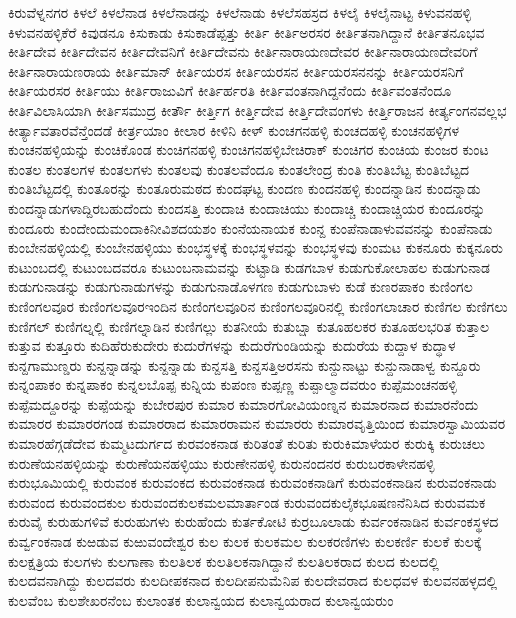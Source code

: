 {ಕಿರುವೆಳ್ನನಗರ
ಕಿಳಲೆ
ಕಿಳಲೆನಾಡ
ಕಿಳಲೆನಾಡನ್ನು
ಕಿಳಲೆನಾಡು
ಕಿಳಲೆಸಹಸ್ರದ
ಕಿಳಲೈ
ಕಿಳಲೈನಾಟ್ಟ
ಕಿಳುವನಹಳ್ಳಿ
ಕಿಳುವನಹಳ್ಳಿಕೆರೆ
ಕಿವುಡನೂ
ಕಿಸುಕಾಡು
ಕಿಸುಕಾಡೆಪ್ಪತ್ತು
ಕೀರ್ತಿ
ಕೀರ್ತಿಅರಸರ
ಕೀರ್ತಿತನಾಗಿದ್ದಾನೆ
ಕೀರ್ತಿತನೂಭವ
ಕೀರ್ತಿದೇವ
ಕೀರ್ತಿದೇವನ
ಕೀರ್ತಿದೇವನಿಗೆ
ಕೀರ್ತಿದೇವನು
ಕೀರ್ತಿನಾರಾಯಣದೇವರ
ಕೀರ್ತಿನಾರಾಯಣದೇವರಿಗೆ
ಕೀರ್ತಿನಾರಾಯಣರಾಯ
ಕೀರ್ತಿಮಾನ್
ಕೀರ್ತಿಯರಸ
ಕೀರ್ತಿಯರಸನ
ಕೀರ್ತಿಯರಸನನನ್ನು
ಕೀರ್ತಿಯರಸನಿಗೆ
ಕೀರ್ತಿಯರಸರ
ಕೀರ್ತಿಯು
ಕೀರ್ತಿರಾಜುವಿಗೆ
ಕೀರ್ತಿರ್ಹರತಿ
ಕೀರ್ತಿವಂತನಾಗಿದ್ದನೆಂದು
ಕೀರ್ತಿವಂತನೆಂದೂ
ಕೀರ್ತಿವಿಲಾಸಿಯಾಗಿ
ಕೀರ್ತಿಸಮುದ್ರ
ಕೀರ್ತೌ
ಕೀರ್ತ್ತಿಗ
ಕೀರ್ತ್ತಿದೇವ
ಕೀರ್ತ್ತಿದೇವಂಗಳು
ಕೀರ್ತ್ತಿರಾಜನ
ಕೀರ್ತ್ಯಂಗನವಲ್ಲಭ
ಕೀರ್ತ್ಯಾವತಾರವೆನ್ತೆಂದಡೆ
ಕೀರ್ತ್ರಯಾಂ
ಕೀಲಾರ
ಕೀಳಿನಿ
ಕೀಳ್
ಕುಂಚಗನಹಳ್ಳಿ
ಕುಂಚದಹಳ್ಳಿ
ಕುಂಚನಹಳ್ಳಿಗಳ
ಕುಂಚನಹಳ್ಳಿಯನ್ನು
ಕುಂಚಿಕೊಂಡ
ಕುಂಚಿಗನಹಳ್ಳಿ
ಕುಂಚಿಗನಹಳ್ಳಿಬೇಚಿರಾಕ್
ಕುಂಚಿಗರ
ಕುಂಚಿಯ
ಕುಂಜರ
ಕುಂಟ
ಕುಂತಲ
ಕುಂತಲಗಳ
ಕುಂತಲಗಳು
ಕುಂತಲವು
ಕುಂತಲವೆಂದೂ
ಕುಂತಲೇಂದ್ರ
ಕುಂತಿ
ಕುಂತಿಬೆಟ್ಟ
ಕುಂತಿಬೆಟ್ಟದ
ಕುಂತಿಬೆಟ್ಟದಲ್ಲಿ
ಕುಂತೂರನ್ನು
ಕುಂತೂರುಮಠದ
ಕುಂದಘಟ್ಟ
ಕುಂದಣ
ಕುಂದನಹಳ್ಳಿ
ಕುಂದನ್ನಾಡಿನ
ಕುಂದನ್ನಾಡು
ಕುಂದನ್ನಾಡುಗಳಾದ್ದಿರಬಹುದೆಂದು
ಕುಂದಸತ್ತಿ
ಕುಂದಾಚಿ
ಕುಂದಾಚಿಯು
ಕುಂದಾಚ್ಚಿ
ಕುಂದಾಚ್ಚಿಯರ
ಕುಂದೂರನ್ನು
ಕುಂದೂರು
ಕುಂದೇಂದುಮಂದಾಕಿನೀವಿಶದಯಶಂ
ಕುಂನೆಯನಾಯಕ
ಕುಂನ್ದ
ಕುಂಪೆನಾಡಾಳುವವನನ್ನು
ಕುಂಪೆನಾಡು
ಕುಂಬೇನಹಳ್ಳಿಯಲ್ಲಿ
ಕುಂಬೇನಹಳ್ಳಿಯು
ಕುಂಭಸ್ಥಳಕ್ಕೆ
ಕುಂಭಸ್ಥಳವನ್ನು
ಕುಂಭಸ್ಥಳವು
ಕುಂಮಟ
ಕುಕನೂರು
ಕುಕ್ಕನೂರು
ಕುಟುಂಬದಲ್ಲಿ
ಕುಟುಂಬದವರೂ
ಕುಟುಂಬನಾಮವನ್ನು
ಕುಟ್ಟಾಡಿ
ಕುಡಗಬಾಳ
ಕುಡುಗುಕೋಲಾಹಲ
ಕುಡುಗುನಾಡ
ಕುಡುಗುನಾಡನ್ನು
ಕುಡುಗುನಾಡುಗಳನ್ನು
ಕುಡುಗುನಾಡೊಳಗಣ
ಕುಡುಗುಬಾಳು
ಕುಡೆ
ಕುಣರಪಾಕಂ
ಕುಣಿಂಗಲ
ಕುಣಿಂಗಲವೂರ
ಕುಣಿಂಗಲವೂರಇಂದಿನ
ಕುಣಿಂಗಲವೂರಿನ
ಕುಣಿಂಗಲವೂರಿನಲ್ಲಿ
ಕುಣಿಂಗಲಾಚಾರ
ಕುಣಿಗಲ
ಕುಣಿಗಲು
ಕುಣಿಗಲ್
ಕುಣಿಗಲ್ನಲ್ಲಿ
ಕುಣಿಗಲ್ನಾಡಿನ
ಕುಣಿಗಲ್ಲು
ಕುತನೀಯೆ
ಕುತುಬ್ಷಾ
ಕುತೂಹಲಕರ
ಕುತೂಹಲಭರಿತ
ಕುತ್ತಾಲ
ಕುತ್ತುವ
ಕುತ್ತೂರು
ಕುದಿಹೆರುಕುದೇರು
ಕುದುರೆಗಳನ್ನು
ಕುದುರೆಗುಂಡಿಯನ್ನು
ಕುದುರೆಯ
ಕುದ್ದಾಳ
ಕುದ್ಧಾಳ
ಕುನ್ದಗಾಮುಣ್ಡರು
ಕುನ್ದನ್ನಾಡನ್ನು
ಕುನ್ದನ್ನಾಡು
ಕುನ್ದಸತ್ತಿ
ಕುನ್ದಸತ್ತಿಅರಸನು
ಕುನ್ದುನಾಟ್ಟು
ಕುನ್ದುನಾಡಾಳ್ವ
ಕುನ್ದೂರು
ಕುನ್ನಂಪಾಕಂ
ಕುನ್ನಪಾಕಂ
ಕುನ್ನಲಬೊಪ್ಪ
ಕುನ್ನಿಯ
ಕುಪಂಣ
ಕುಪ್ಪಣ್ಣ
ಕುಪ್ಪಾಲ್ಮಾದವರುಂ
ಕುಪ್ಪೆಮಂಚನಹಳ್ಳಿ
ಕುಪ್ಪೆಮದ್ದೂರನ್ನು
ಕುಪ್ಪೆಯನ್ನು
ಕುಬೇರಪುರ
ಕುಮಾರ
ಕುಮಾರಗೋವಿಯಂಣ್ನನ
ಕುಮಾರನಾದ
ಕುಮಾರನೆಂದು
ಕುಮಾರರ
ಕುಮಾರರಗಂಡ
ಕುಮಾರರಾದ
ಕುಮಾರರಾಮನ
ಕುಮಾರರು
ಕುಮಾರವೃತ್ತಿಯಿಂದ
ಕುಮಾರಸ್ವಾಮಿಯವರ
ಕುಮಾರಹೆಗ್ಗಡೆದೇವ
ಕುಮ್ಮಟದುರ್ಗದ
ಕುರವಂಕನಾಡ
ಕುರಿತಂತೆ
ಕುರಿತು
ಕುರುಕಿಮಾಳೆಯರ
ಕುರುಕ್ಕಿ
ಕುರುಚಲು
ಕುರುಣೆಯನಹಳ್ಳಿಯನ್ನು
ಕುರುಣೆಯನಹಳ್ಳಿಯು
ಕುರುಣೇನಹಳ್ಳಿ
ಕುರುನಂದನರ
ಕುರುಬರಕಾಳೇನಹಳ್ಳಿ
ಕುರುಭೂಮಿಯಲ್ಲಿ
ಕುರುವಂಕ
ಕುರುವಂಕದ
ಕುರುವಂಕನಾಡ
ಕುರುವಂಕನಾಡಿಗೆ
ಕುರುವಂಕನಾಡಿನ
ಕುರುವಂಕನಾಡು
ಕುರುವಂದ
ಕುರುವಂದಕುಲ
ಕುರುವಂದಕುಲಕಮಲಮಾರ್ತಾಂಡ
ಕುರುವಂದಕುಲೈಕಭೂಷಣನೆನಿಸಿದ
ಕುರುವಮಕ
ಕುರುವೈ
ಕುರುಹುಗಳಿವೆ
ಕುರುಹುಗಳು
ಕುರುಹೆಂದು
ಕುರ್ತಕೋಟಿ
ಕುರ್ರಬೂಲಾಡು
ಕುರ್ವಂಕನಾಡಿನ
ಕುರ್ವಂಕಸ್ಥಳದ
ಕುರ್ವ್ವಂಕನಾಡ
ಕುಱಡುವ
ಕುಱುವಂದೇಶ್ವರ
ಕುಲ
ಕುಲಕ
ಕುಲಕಮಲ
ಕುಲಕರಣಿಗಳು
ಕುಲಕರ್ಣಿ
ಕುಲಕೆ
ಕುಲಕ್ಕೆ
ಕುಲಕ್ಷತ್ರಿಯ
ಕುಲಗಳು
ಕುಲಗಾಣಾ
ಕುಲತಿಲಕ
ಕುಲತಿಲಕನಾಗಿದ್ದಾನೆ
ಕುಲತಿಲಕರಾದ
ಕುಲದ
ಕುಲದಲ್ಲಿ
ಕುಲದವನಾಗಿದ್ದು
ಕುಲದವರು
ಕುಲದೀಪಕನಾದ
ಕುಲದೀಪನುಮೆನಿಪ
ಕುಲದೇವರಾದ
ಕುಲಧವಳ
ಕುಲವನಹಳ್ಳದಲ್ಲಿ
ಕುಲವೆಂಬ
ಕುಲಶೇಖರನೆಂಬ
ಕುಲಾಂತಕ
ಕುಲಾನ್ವಯದ
ಕುಲಾನ್ವಯರಾದ
ಕುಲಾನ್ವಯರುಂ
}
